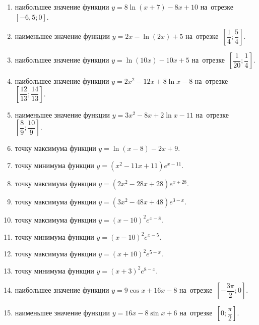 \documentclass[a4paper,10pt]{article}
\begin{document}
\begin{enumerate}
\item {} наибольшее значение функции $y=8\ln \left(x+7\right)-8x+10$ на~отрезке~$\left[-6,5;0\right]$.

\item {} наименьшее значение функции $y=2x-\ln \left(2x\right)+5$ на~отрезке~$\left[\dfrac{1}{4};\dfrac{5}{4}\right]$.

\item {} наибольшее значение функции $y=\ln \left(10x\right)-10x+5$ на~отрезке~$\left[\dfrac{1}{20};\dfrac{1}{4}\right]$.

\item {} наибольшее значение функции $y=2x^2-12x+8\ln x-8$ на~отрезке~$\left[\dfrac{12}{13};\dfrac{14}{13}\right]$.

\item {} наименьшее значение функции $y=3x^2-8x+2\ln x-11$ на~отрезке~$\left[\dfrac{8}{9};\dfrac{10}{9}\right]$.

\item {} точку максимума функции $y=\ln \left(x-8\right)-2x+9$.

\item {} точку минимума функции $y=\left(x^2-11x+11\right)e^{x-11}$.

\item {} точку максимума функции $y=\left(2x^2-28x+28\right)e^{x+28}$.

\item {} точку максимума функции $y=\left(3x^2-48x+48\right)e^{3-x}$.

\item {} точку максимума функции $y=\left(x-10\right)^2e^{x-8}$.

\item {} точку минимума функции $y=\left(x-10\right)^2e^{x-5}$.

\item {} точку максимума функции $y=\left(x+10\right)^2e^{5-x}$.

\item {} точку минимума функции $y=\left(x+3\right)^2e^{8-x}$.

\item {} наибольшее значение функции $y=9\cos x+16x-8$ на~отрезке~$\left[-\dfrac{3\pi }{2};0\right]$.

\item {} наименьшее значение функции $y=16x-8\sin x+6$ на~отрезке~$\left[0;\dfrac{\pi }{2}\right]$.


\end{enumerate}
\end{document}
